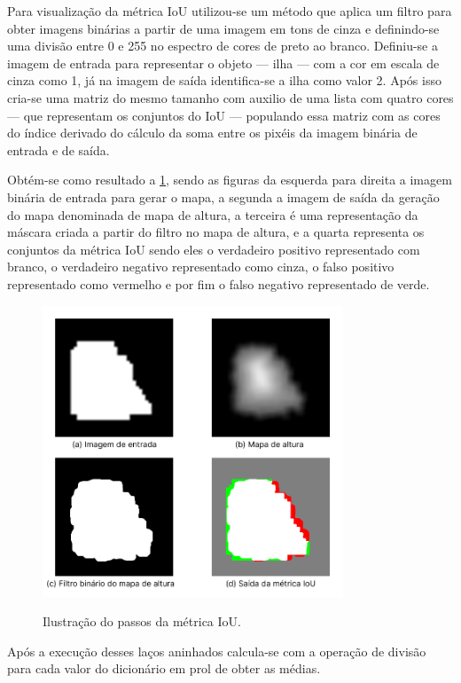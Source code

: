 Para visualização da métrica IoU utilizou-se um método que aplica um filtro para obter imagens binárias a partir de uma imagem em tons de cinza e definindo-se uma divisão entre 0 e 255 no espectro de cores de preto ao branco. Definiu-se a imagem de entrada para representar o objeto — ilha — com a cor em escala de cinza como 1, já na imagem de saída identifica-se a ilha como valor 2. Após isso cria-se uma matriz do mesmo tamanho com auxilio de uma lista com quatro cores — que representam os conjuntos do IoU — populando essa matriz com as cores do índice derivado do cálculo da soma entre os pixéis da imagem binária de entrada e de saída.

Obtém-se como resultado a \cref{fig:resultado_iou}, sendo as figuras da esquerda para direita a imagem binária de entrada para gerar o mapa, a segunda a imagem de saída da geração do mapa denominada de mapa de altura, a terceira é uma representação da máscara criada a partir do filtro no mapa de altura, e a quarta representa os conjuntos da métrica IoU sendo eles o verdadeiro positivo representado com branco, o verdadeiro negativo representado como cinza, o falso positivo representado como vermelho e por fim o falso negativo representado de verde.

\begin{figure}[!ht]
	\centering
    \caption{Ilustração do passos da métrica IoU.}
	\includegraphics[width=0.8\textwidth]{figures/passos_iou.png}
	\label{fig:resultado_iou}
\end{figure}

Após a execução desses laços aninhados calcula-se com a operação de divisão para cada valor do dicionário em prol de obter as médias.



